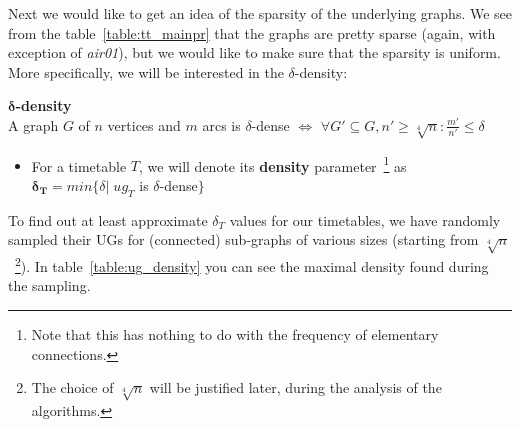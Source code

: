 	Next we would like to get an idea of the sparsity of the underlying graphs. We see from the table~\ref{table:tt_mainpr} that the graphs are pretty sparse (again, with exception of \textit{air01}), but we would like to make sure that the sparsity is uniform. More specifically, we will be interested in the $\delta$-density:
	
	\begin{definition}
		\textbf{$\bm{\delta}$-density} \\
		A graph $G$ of $n$ vertices and $m$ arcs is $\delta$-dense $\iff$ $\forall G' \subseteq G, n' \geq \sqrt[4]{n}: \frac{\displaystyle m'}{\displaystyle n'} \leq \delta$
		\begin{itemize}
			\item For a timetable $T$, we will denote its \textbf{density} parameter~\footnote{Note that this has nothing to do with the frequency of elementary connections.} as $\bm{\delta_{T}} = min \{\delta|\; ug_{T}$ is $\delta$-dense$\}$
		\end{itemize}
	\end{definition}
	
	\noindent To find out at least approximate $\delta_{T}$ values for our timetables, we have randomly sampled their UGs for (connected) sub-graphs of various sizes (starting from $\sqrt[4]{n}$~\footnote{The choice of $\sqrt[4]{n}$ will be justified later, during the analysis of the algorithms.}). In table~\ref{table:ug_density} you can see the maximal density found during the sampling. \\
	
